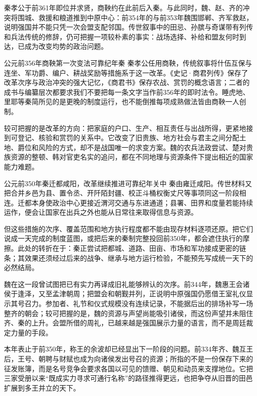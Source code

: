 秦孝公于前361年即位并求贤，商鞅约在此前后入秦。与此同时，魏、赵、齐的冲突将围城、救援和粮道推到中原中心：前354年的与前353年魏围邯郸、齐军救赵，说明强国并不能只凭一次会盟支配邻国。传世叙事中的田忌、孙膑与奇谋带有列传和兵法传统的修辞，仍可把握一项较朴素的事实：战场选择、补给和盟友何时到达，已成为改变均势的政治问题。

\begin{event}{公元前356年}{商鞅第一次变法}{可靠纪年}{秦}
秦孝公任用商鞅，传统叙事将什伍互保与连坐、军功爵、编户、耕战奖励等措施系于这一改革。《史记·商君列传》保存了改革次序与政治冲突的强大记忆，《商君书》保存农战、赏罚的概念语言；二者的成书与编纂层次都要求我们不要把每一条文字当作前356年的即时法令。睡虎地、里耶等秦简所见的是更晚的制度运行，也不能倒推每项成熟做法皆由商鞅一人创制。

较可把握的是改革的方向：把家庭的户口、生产、相互责任与出战所得，更紧地接到可登记、核验和赏罚的关系中。它改变了旧贵族、地方社会与君主之间分配土地、爵位和风险的方式，却不是战国唯一的求变方案。魏的农兵法政尝试、楚对贵族资源的整顿、韩对官吏名实的追问，都在不同地理与资源条件下提出相近的国家能力难题。
\end{event}

\begin{event}{公元前350年}{秦迁都咸阳，改革继续推进}{可靠纪年}{关中}
秦由雍迁咸阳。传世材料又把合并乡邑为县、置令丞、开阡陌封疆、校正斗桶权衡丈尺等事项同这一阶段相连。迁都本身使政治中心更接近渭河交通与东进通道；县署、田界和度量若能持续运作，便会让国家在出兵之外也能从日常往来取得信息与资源。

但这些措施的次序、覆盖范围和地方执行程度都不能由现存材料逐项还原。把它们说成一天完成的制度蓝图，或把后来的秦制完整投回前350年，都会遮住执行的摩擦。此处的转折在于：秦正尝试把都城、道路、田亩、市场和军功接成更密的链条；其效果还须经过后来的战争、继承与地方运行检验，不能预先写成统一天下的必然结局。
\end{event}

魏在这一段曾试图把已有实力再译成旧礼能够辨认的次序。前344年，魏惠王会诸侯于逢泽，又至孟津朝周；把盟会和朝觐并列，正说明中原强国仍愿借王室礼仪显示其号召力。参加者、礼节和仪式规模没有连续记录，不能据后出的排场补写一场整齐的朝会；较可把握的是，魏的资源与声望尚能吸引诸侯，而这份声望并未阻住齐、秦的上升。会盟所借的周礼，已越来越是强国展示力量的语言，而不是周廷裁定力量的手段。

本年表止于前350年，称王的余波却已经显出下一阶段的问题。前334年齐、魏互王后，王号、朝聘与财赋也成为向诸侯发出号召的资源；所指的不是一份保存下来的征发账簿，而是名号竞争会要求各国以可见的馈赠、朝见和动员来支撑地位。它把三家受册以来“既成实力寻求可通行名称”的路径推得更远，也把争夺从旧晋的田邑扩展到多王并立的天下。

